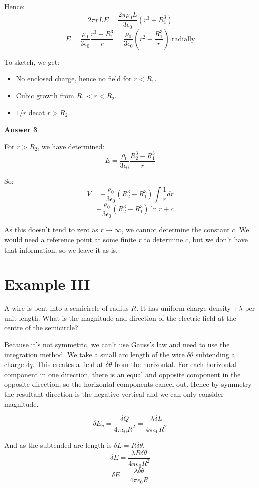 Hence:
\[
    2 \pi r L E = \frac{2 \pi \rho_0 L}{3 \epsilon_0} \left(r^3 - R_1^3\right)
\]
\[
    E = \frac{\rho_0}{3 \epsilon_0} \frac{r^3 - R_1^3}{r} = \frac{\rho_0}{3 \epsilon_0} \left(r^2 - \frac{R_1^3}{r}\right) \text{ radially}  
\]

To sketch, we get:
\begin{itemize}
    \item No enclosed charge, hence no field for $r < R_1$.
    \item Cubic growth from $R_1 < r < R_2$.
    \item $1/r$ decat $r > R_2$.
\end{itemize}

\textbf{Answer 3}

For $r > R_2$, we have determined:
\[
    E = \frac{\rho_0}{3 \epsilon_0} \frac{R_2^3 - R_1^3}{r}
\]

So:
\[
    V = - \frac{\rho_0}{3 \epsilon_0} (R_2^3 - R_1^3) \int \frac{1}{r} dr
\]
\[
    = - \frac{\rho_0}{3 \epsilon_0} (R^3_2 - R^3_1) \ln r + c
\]

As this doesn't tend to zero as $r \to \infty$, we cannot determine the constant $c$. We would need a reference point at some finite $r$ to determine $c$, but we don't have that information, so we leave it as is.

\section{Example III}
A wire is bent into a semicircle of radius $R$. It has uniform charge density $+ \lambda$ per unit length. What is the magnitude and direction of the electric field at the centre of the semicircle?

Because it's not symmetric, we can't use Gauss's law and need to use the integration method. We take a small arc length of the wire $\delta \theta$ subtending a charge $\delta q$. This creates a field at $\delta \theta$ from the horizontal. For each horizontal component in one direction, there is an equal and opposite component in the opposite direction, so the horizontal components cancel out. Hence by symmetry the resultant direction is the negative vertical and we can only consider magnitude.

\[
    \delta E_y = \frac{\delta Q}{4 \pi \epsilon_0 R^2} = \frac{\lambda \delta L}{4 \pi \epsilon_0 R^2}
\]

And as the subtended arc length is $\delta L = R \delta \theta$,
\[
    \delta E = \frac{\lambda R \delta \theta}{4 \pi \epsilon_0 R^2}
\]
\[
    \delta E = \frac{\lambda \delta \theta}{4 \pi \epsilon_0 R}
\]

